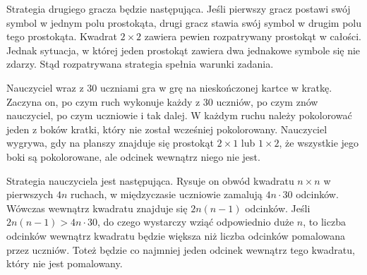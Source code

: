 \begin{center}
\end{center}
Strategia drugiego gracza będzie następująca. Jeśli pierwszy gracz postawi swój symbol w jednym polu prostokąta, drugi gracz stawia swój symbol w drugim polu tego prostokąta. Kwadrat $2 \times 2$ zawiera pewien rozpatrywany prostokąt w całości. Jednak sytuacja, w której jeden prostokąt zawiera dwa jednakowe symbole się nie zdarzy. Stąd rozpatrywana strategia spełnia warunki zadania.


\begin{problem}{5}
	Nauczyciel wraz z 30 uczniami gra w grę na nieskończonej kartce w kratkę. Zaczyna on, po czym ruch wykonuje każdy z 30 uczniów, po czym znów nauczyciel, po czym uczniowie i tak dalej. W każdym ruchu należy pokolorować jeden z boków kratki, który nie został wcześniej pokolorowany. Nauczyciel wygrywa, gdy na planszy znajduje się prostokąt $2 \times 1$ lub $1 \times 2$, że wszystkie jego boki są pokolorowane, ale odcinek wewnątrz niego nie jest.
\end{problem}

\noindent
Strategia nauczyciela jest następująca. Rysuje on obwód kwadratu $n \times n$ w pierwszych $4n$ ruchach, w międzyczasie uczniowie zamalują $4n \cdot 30$ odcinków. Wówczas wewnątrz kwadratu znajduje się $2n(n - 1)$ odcinków. Jeśli $2n(n - 1) > 4n \cdot 30$, do czego wystarczy wziąć odpowiednio duże $n$, to liczba odcinków wewnątrz kwadratu będzie większa niż liczba odcinków pomalowana przez uczniów. Toteż będzie co najmniej jeden odcinek wewnątrz tego kwadratu, który nie jest pomalowany.

